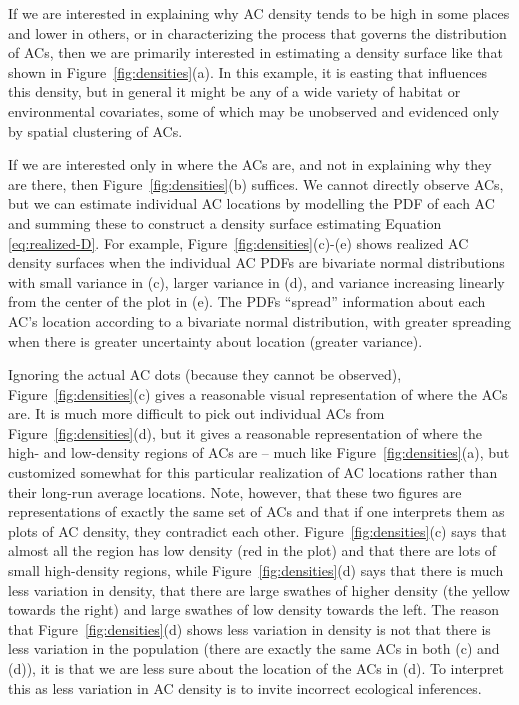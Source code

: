 \documentclass[useAMS,usenatbib,referee]{biom}
\begin{document}
If we are interested in explaining why AC density tends to be high in some places and lower in others, or in characterizing the process that governs the distribution of ACs, then we are primarily interested in estimating a density surface like that shown in Figure~\ref{fig:densities}(a). In this example, it is easting that influences this density, but in general it might be any of a wide variety of habitat or environmental covariates, some of which may be unobserved and evidenced only by spatial clustering of ACs. 

If we are interested only in where the ACs are, and not in explaining why they are there, then Figure~\ref{fig:densities}(b) suffices. We cannot directly observe ACs, but we can estimate individual AC locations by modelling the PDF of each AC and summing these to construct a density surface estimating Equation \eqref{eq:realized-D}. For example, Figure~\ref{fig:densities}(c)-(e) shows realized AC density surfaces when the individual AC PDFs are bivariate normal distributions with small variance in (c), larger variance in (d), and variance increasing linearly from the center of the plot in (e). The PDFs ``spread'' information about each AC's location according to a bivariate normal distribution, with greater spreading when there is greater uncertainty about location (greater variance).

Ignoring the actual AC dots (because they cannot be observed), Figure~\ref{fig:densities}(c) gives a reasonable visual representation of where the ACs are. It is much more difficult to pick out individual ACs from Figure~\ref{fig:densities}(d), but it gives a reasonable representation of where the high- and low-density regions of ACs are -- much like Figure~\ref{fig:densities}(a), but customized somewhat for this particular realization of AC locations rather than their long-run average locations. Note, however, that these two figures are representations of exactly the same set of ACs and that if one interprets them as plots of AC density, they contradict each other. Figure~\ref{fig:densities}(c) says that almost all the region has low density (red in the plot) and that there are lots of small high-density regions, while Figure~\ref{fig:densities}(d) says that there is much less variation in density, that there are large swathes of higher density (the yellow towards the right) and large swathes of low density towards the left. The reason that Figure~\ref{fig:densities}(d) shows less variation in density is not that there is less variation in the population (there are exactly the same ACs in both (c) and (d)), it is that we are less sure about the location of the ACs in (d). To interpret this as less variation in AC density is to invite incorrect ecological inferences.
\end{document}
